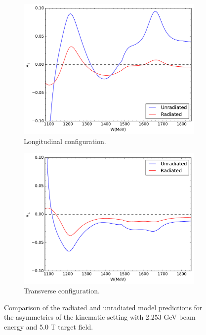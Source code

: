 \begin{figure}[p!]
  \centering
  \begin{subfigure}[t]{0.79\textwidth}
    \includegraphics[width=\textwidth]{figs/asymmetry-model-22535000.pdf}
    \caption{Longitudinal configuration. \label{C8S2F2a}}
  \end{subfigure}
  \begin{subfigure}[t]{0.79\textwidth}
    \includegraphics[width=\textwidth]{figs/asymmetry-model-22535090.pdf}
    \caption{Transverse configuration. \label{C8S2F2b}}
  \end{subfigure}
  \caption[Comparison of the radiated and unradiated model predictions.]{Comparison of the radiated and unradiated model predictions for the asymmetries of the kinematic setting with 2.253 GeV beam energy and 5.0 T target field. \label{C8S2F2}}
\end{figure}

